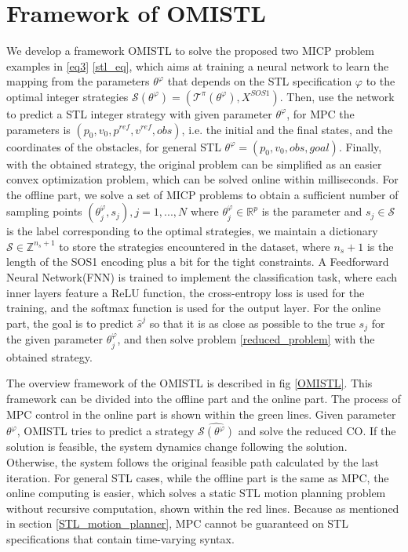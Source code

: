 \documentclass[a4paper]{report}
\begin{document}
\section*{Framework of OMISTL}
We develop a framework OMISTL to solve the proposed two MICP problem examples in \ref{eq3} \ref*{stl_eq}, which aims at training a neural network to learn the mapping from the parameters $\theta^\varphi$ that depends on the STL specification $\varphi$ to the optimal integer strategies $ \mathcal{S}(\theta^\varphi) =(\mathcal{T}^\pi(\theta^\varphi), X^{SOS1})$. Then, use the network to predict a STL integer strategy with given parameter $\theta^\varphi$, for MPC the parameters is $(p_0,v_0,p^{ref},v^{ref},obs)$, i.e. the initial and the final states, and the coordinates of the obstacles, for general STL $\theta^{\varphi} = (p_0,v_0,obs,goal)$. Finally, with the obtained strategy, the original problem can be simplified as an easier convex optimization problem, which can be solved online within milliseconds.
For the offline part, we solve a set of MICP problems to obtain a sufficient number of sampling points $(\theta_j^\varphi,s_j), j = 1, ..., N$ where $\theta_j^\varphi \in \mathbb{R}^p$ is the parameter and $s_j \in \mathcal{S}$ is the label corresponding to the optimal strategies, we maintain a dictionary $\mathcal{S} \in \mathbb{Z}^{n_s+1}$ to store the strategies encountered in the dataset, where $n_s+1$ is the length of the SOS1 encoding plus a bit for the tight constraints. A Feedforward Neural Network(FNN) is trained to implement the classification task, where each inner layers feature a ReLU function, the cross-entropy loss is used for the training, and the softmax function is used for the output layer.
For the online part, the goal is to predict $\hat{s}^j$ so that it is as close as possible to the true $s_j$ for the given parameter $\theta_j^\varphi$, and then solve problem \ref{reduced_problem} with the obtained strategy. 

The overview framework of the OMISTL is described in fig \ref*{OMISTL}. This framework can be divided into the offline part and the online part. The process of MPC control in the online part is shown within the green lines. Given parameter $\theta^\varphi$, OMISTL tries to predict a strategy $\hat{\mathcal{S}(\theta^\varphi)}$ and solve the reduced CO. If the solution is feasible, the system dynamics change following the solution. Otherwise, the system follows the original feasible path calculated by the last iteration. For general STL cases, while the offline part is the same as MPC, the online computing is easier, which solves a static STL motion planning problem without recursive computation, shown within the red lines. Because as mentioned in section \ref{STL_motion_planner}, MPC cannot be guaranteed on STL specifications that contain time-varying syntax.
 
\end{document}
